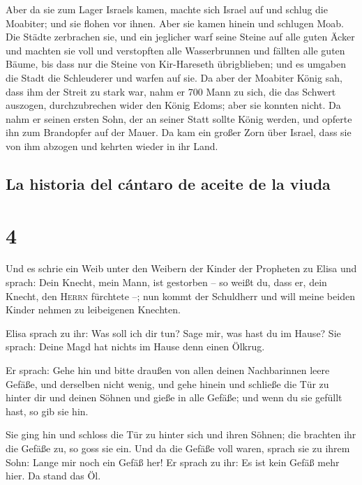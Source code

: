  Aber da sie zum Lager Israels kamen, machte sich Israel
auf und schlug die Moabiter; und sie flohen vor ihnen. Aber sie kamen
hinein und schlugen Moab.  Die Städte zerbrachen sie, und
ein jeglicher warf seine Steine auf alle guten Äcker und machten sie
voll und verstopften alle Wasserbrunnen und fällten alle guten Bäume,
bis dass nur die Steine von Kir-Hareseth übrigblieben; und es umgaben
die Stadt die Schleuderer und warfen auf sie.  Da aber
der Moabiter König sah, dass ihm der Streit zu stark war, nahm er 700
Mann zu sich, die das Schwert auszogen, durchzubrechen wider den König
Edoms; aber sie konnten nicht.  Da nahm er seinen ersten
Sohn, der an seiner Statt sollte König werden, und opferte ihn zum
Brandopfer auf der Mauer. Da kam ein großer Zorn über Israel, dass sie
von ihm abzogen und kehrten wieder in ihr Land.

\hypertarget{la-historia-del-cuxe1ntaro-de-aceite-de-la-viuda}{%
\subsection{La historia del cántaro de aceite de la
viuda}\label{la-historia-del-cuxe1ntaro-de-aceite-de-la-viuda}}

\hypertarget{section-3}{%
\section{4}\label{section-3}}

 Und es schrie ein Weib unter den Weibern der Kinder der
Propheten zu Elisa und sprach: Dein Knecht, mein Mann, ist gestorben --
so weißt du, dass er, dein Knecht, den \textsc{Herrn} fürchtete --; nun
kommt der Schuldherr und will meine beiden Kinder nehmen zu leibeigenen
Knechten.

 Elisa sprach zu ihr: Was soll ich dir tun? Sage mir, was
hast du im Hause? Sie sprach: Deine Magd hat nichts im Hause denn einen
Ölkrug.

 Er sprach: Gehe hin und bitte draußen von allen deinen
Nachbarinnen leere Gefäße, und derselben nicht wenig,  und
gehe hinein und schließe die Tür zu hinter dir und deinen Söhnen und
gieße in alle Gefäße; und wenn du sie gefüllt hast, so gib sie hin.

 Sie ging hin und schloss die Tür zu hinter sich und ihren
Söhnen; die brachten ihr die Gefäße zu, so goss sie ein. 
Und da die Gefäße voll waren, sprach sie zu ihrem Sohn: Lange mir noch
ein Gefäß her! Er sprach zu ihr: Es ist kein Gefäß mehr hier. Da stand
das Öl.

